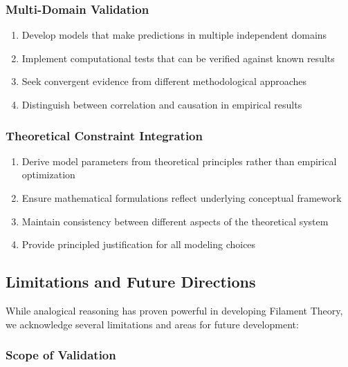 \subsubsection{Multi-Domain Validation}

\begin{guideline}
\begin{enumerate}
\item Develop models that make predictions in multiple independent domains
\item Implement computational tests that can be verified against known results
\item Seek convergent evidence from different methodological approaches
\item Distinguish between correlation and causation in empirical results
\end{enumerate}
\end{guideline}

\subsubsection{Theoretical Constraint Integration}

\begin{guideline}
\begin{enumerate}
\item Derive model parameters from theoretical principles rather than empirical optimization
\item Ensure mathematical formulations reflect underlying conceptual framework
\item Maintain consistency between different aspects of the theoretical system
\item Provide principled justification for all modeling choices
\end{enumerate}
\end{guideline}

\subsection{Limitations and Future Directions}

While analogical reasoning has proven powerful in developing Filament Theory, we acknowledge several limitations and areas for future development:

\subsubsection{Scope of Validation}

